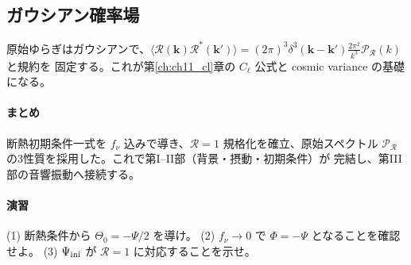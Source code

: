 \subsection{ガウシアン確率場}
原始ゆらぎはガウシアンで、$\langle\mathcal R(\mathbf k)\mathcal R^*(\mathbf k')\rangle
=(2\pi)^3\delta^3(\mathbf k-\mathbf k')\frac{2\pi^2}{k^3}\mathcal P_\mathcal R(k)$ と規約を
固定する。これが第\ref{ch:ch11_cl}章の $C_\ell$ 公式と cosmic variance の基礎になる。

\paragraph{まとめ}
断熱初期条件一式を $f_\nu$ 込みで導き、$\mathcal R=1$ 規格化を確立、原始スペクトル
$\mathcal P_\mathcal R$ の3性質を採用した。これで第I--II部（背景・摂動・初期条件）が
完結し、第III部の音響振動へ接続する。

\paragraph{演習}
(1) 断熱条件から $\Theta_0=-\Psi/2$ を導け。
(2) $f_\nu\to0$ で $\Phi=-\Psi$ となることを確認せよ。
(3) $\Psi_{\rm ini}$ が $\mathcal R=1$ に対応することを示せ。

